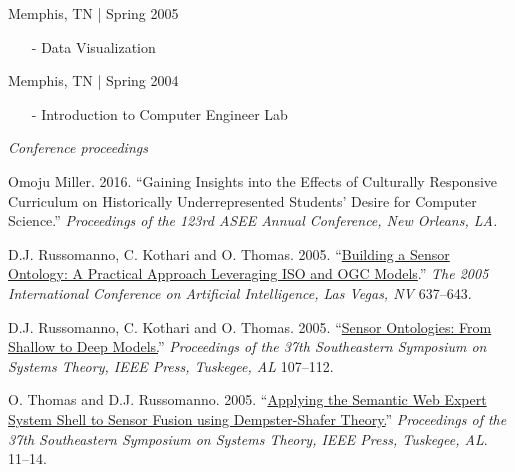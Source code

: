 \documentclass[11pt,article,oneside]{memoir}
\begin{document}
 \hfill Memphis, TN | Spring 2005
\begin{itemize}[noitemsep,nolistsep]
\item[-] Data Visualization
\end{itemize}

 \hfill Memphis, TN | Spring 2004
\begin{itemize}[noitemsep,nolistsep]
\item[-] Introduction to Computer Engineer Lab
\end{itemize}

\bigskip 


\medskip

\noindent\emph{Conference proceedings \vspace{0.05in}}


\ind Omoju Miller. 2016. ``Gaining Insights into the Effects of Culturally Responsive Curriculum on Historically Underrepresented Students' Desire for Computer Science.'' \emph{Proceedings of the 123rd ASEE Annual Conference, New Orleans, LA.}

\ind D.J. Russomanno, C. Kothari and O. Thomas. 2005. ``\href{https://scholar.google.com/citations?view_op=view_citation&hl=en&user=E7z_wrwAAAAJ&sortby=pubdate&citation_for_view=E7z_wrwAAAAJ:u5HHmVD_uO8C}{Building a Sensor Ontology: A Practical Approach Leveraging ISO and OGC Models}.'' \emph{The 2005 International Conference on Artificial Intelligence, Las Vegas, NV} 637--643.

\ind D.J. Russomanno, C. Kothari and O. Thomas. 2005. ``\href{http://scholar.google.com/citations?view_op=view_citation&hl=en&user=E7z_wrwAAAAJ&citation_for_view=E7z_wrwAAAAJ:u-x6o8ySG0sC}{Sensor Ontologies: From Shallow to Deep Models.}'' \emph{Proceedings of the 37th Southeastern Symposium on Systems Theory, IEEE Press, Tuskegee, AL} 107--112.

\ind O. Thomas and D.J. Russomanno. 2005. ``\href{http://scholar.google.com/citations?view_op=view_citation&hl=en&user=E7z_wrwAAAAJ&citation_for_view=E7z_wrwAAAAJ:d1gkVwhDpl0C}{Applying the Semantic Web Expert System Shell to Sensor Fusion using Dempster-Shafer Theory.}'' \emph{Proceedings of the 37th Southeastern Symposium on Systems Theory, IEEE Press, Tuskegee, AL}. 11--14.
\end{document}
